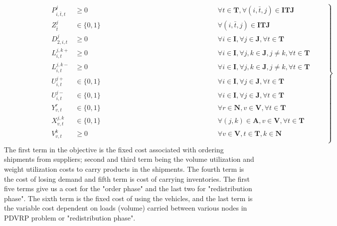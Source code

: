 \documentclass[12pt,a4paper]{article}
\begin{document}
\begin{align}
\left. \qquad \qquad \qquad
\begin{matrix}
P_{i,\bar{t},t}^{j} & \geq 0 & \qquad \qquad \qquad \qquad \qquad \qquad \qquad \qquad \forall t \in \textbf{T}, \forall (i,\bar{t},j)\in \textbf{ITJ} \\
Z_{\bar{t}}^{j} & \in \{0,1\} & \qquad \qquad \qquad \qquad \qquad \qquad \qquad \qquad \forall (i,\bar{t},j)\in \textbf{ITJ} \\
D_{2,i,t}^{j} & \geq 0 & \qquad \qquad \qquad \qquad \qquad \qquad \qquad \qquad \forall i\in \textbf{I},\forall j\in \textbf{J}, \forall t \in \textbf{T}  \\
L_{i,t}^{j,k{+}} & \geq 0 & \qquad \qquad \qquad \qquad \qquad \qquad \qquad \qquad \forall i\in \textbf{I},\forall j,k\in \textbf{J}, j\neq k, \forall t \in \textbf{T}  \\
L_{i,t}^{j,k{-}} & \geq 0 & \qquad \qquad \qquad \qquad \qquad \qquad \qquad \qquad \forall i\in \textbf{I},\forall j,k\in \textbf{J}, j\neq k, \forall t \in \textbf{T}  \\
U_{i,t}^{j{+}} & \in \{0,1\} & \qquad \qquad \qquad \qquad \qquad \qquad \qquad \qquad \forall i\in \textbf{I}, \forall j\in \textbf{J}, \forall t \in \textbf{T}  \\
U_{i,t}^{j{-}} & \in \{0,1\} & \qquad \qquad \qquad \qquad \qquad \qquad \qquad \qquad \forall i\in \textbf{I}, \forall j\in \textbf{J}, \forall t \in \textbf{T}  \\
Y_{v,t}^{r} & \in \{0,1\} & \qquad \qquad \qquad \qquad \qquad \qquad \qquad \qquad \forall r \in \textbf{N}, v \in \textbf{V}, \forall t \in \textbf{T}  \\
X_{v,t}^{j,k} & \in \{0,1\} & \qquad \qquad \qquad \qquad \qquad \qquad \qquad \qquad \forall (j,k) \in \textbf{A}, v \in \textbf{V}, \forall t \in \textbf{T}  \\
V_{v,t}^{k} & \geq 0 & \qquad \qquad \qquad \qquad \qquad \qquad \qquad \qquad \forall v \in \textbf{V}, t \in \textbf{T}, k \in \textbf{N}  \\
\end{matrix}
\qquad \right\}
\end{align}
The first term in the objective is the fixed cost associated with ordering shipments from suppliers; second and third term being the volume utilization and weight utilization costs to carry products in the shipments. The fourth term is the cost of losing demand and fifth term is cost of carrying inventories. The first five terms give us a cost for the "order phase" and the last two for "redistribution phase". The sixth term is the fixed cost of using the vehicles, and the last term is the variable cost dependent on loads (volume) carried between various nodes in PDVRP problem or "redistribution phase". \\
\end{document}
